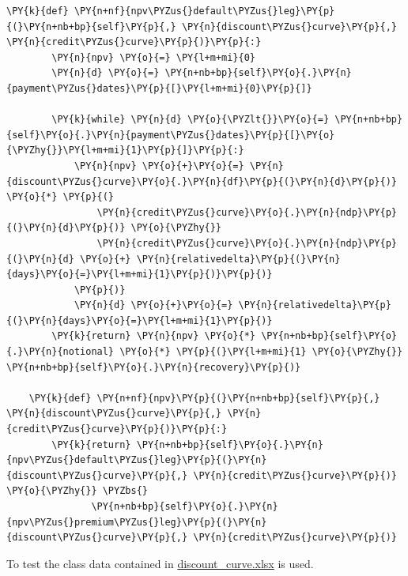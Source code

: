 \begin{tcolorbox}[breakable, size=fbox, boxrule=1pt, pad at break*=1mm,colback=cellbackground, colframe=cellborder]
\begin{Verbatim}[commandchars=\\\{\}]
    \PY{k}{def} \PY{n+nf}{npv\PYZus{}default\PYZus{}leg}\PY{p}{(}\PY{n+nb+bp}{self}\PY{p}{,} \PY{n}{discount\PYZus{}curve}\PY{p}{,} \PY{n}{credit\PYZus{}curve}\PY{p}{)}\PY{p}{:}
        \PY{n}{npv} \PY{o}{=} \PY{l+m+mi}{0}
        \PY{n}{d} \PY{o}{=} \PY{n+nb+bp}{self}\PY{o}{.}\PY{n}{payment\PYZus{}dates}\PY{p}{[}\PY{l+m+mi}{0}\PY{p}{]}
        
        \PY{k}{while} \PY{n}{d} \PY{o}{\PYZlt{}}\PY{o}{=} \PY{n+nb+bp}{self}\PY{o}{.}\PY{n}{payment\PYZus{}dates}\PY{p}{[}\PY{o}{\PYZhy{}}\PY{l+m+mi}{1}\PY{p}{]}\PY{p}{:}
            \PY{n}{npv} \PY{o}{+}\PY{o}{=} \PY{n}{discount\PYZus{}curve}\PY{o}{.}\PY{n}{df}\PY{p}{(}\PY{n}{d}\PY{p}{)} \PY{o}{*} \PY{p}{(}
                \PY{n}{credit\PYZus{}curve}\PY{o}{.}\PY{n}{ndp}\PY{p}{(}\PY{n}{d}\PY{p}{)} \PY{o}{\PYZhy{}}
                \PY{n}{credit\PYZus{}curve}\PY{o}{.}\PY{n}{ndp}\PY{p}{(}\PY{n}{d} \PY{o}{+} \PY{n}{relativedelta}\PY{p}{(}\PY{n}{days}\PY{o}{=}\PY{l+m+mi}{1}\PY{p}{)}\PY{p}{)}
            \PY{p}{)}
            \PY{n}{d} \PY{o}{+}\PY{o}{=} \PY{n}{relativedelta}\PY{p}{(}\PY{n}{days}\PY{o}{=}\PY{l+m+mi}{1}\PY{p}{)}
        \PY{k}{return} \PY{n}{npv} \PY{o}{*} \PY{n+nb+bp}{self}\PY{o}{.}\PY{n}{notional} \PY{o}{*} \PY{p}{(}\PY{l+m+mi}{1} \PY{o}{\PYZhy{}} \PY{n+nb+bp}{self}\PY{o}{.}\PY{n}{recovery}\PY{p}{)}
    
    \PY{k}{def} \PY{n+nf}{npv}\PY{p}{(}\PY{n+nb+bp}{self}\PY{p}{,} \PY{n}{discount\PYZus{}curve}\PY{p}{,} \PY{n}{credit\PYZus{}curve}\PY{p}{)}\PY{p}{:}
        \PY{k}{return} \PY{n+nb+bp}{self}\PY{o}{.}\PY{n}{npv\PYZus{}default\PYZus{}leg}\PY{p}{(}\PY{n}{discount\PYZus{}curve}\PY{p}{,} \PY{n}{credit\PYZus{}curve}\PY{p}{)} \PY{o}{\PYZhy{}} \PYZbs{}
               \PY{n+nb+bp}{self}\PY{o}{.}\PY{n}{npv\PYZus{}premium\PYZus{}leg}\PY{p}{(}\PY{n}{discount\PYZus{}curve}\PY{p}{,} \PY{n}{credit\PYZus{}curve}\PY{p}{)}
\end{Verbatim}
\end{tcolorbox}    

To test the class data contained in \href{https://drive.google.com/file/d/14R22r7m-6VpQ_P79D3qHdK0QN_mOQ_UB/view?usp=sharing}{discount\_curve.xlsx} is used.


